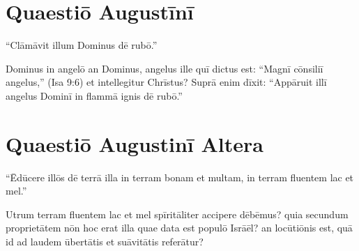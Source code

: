 \section{Quaestiō Augustīnī}

``Clāmāvit illum Dominus dē rubō.''

Dominus in angelō an Dominus, angelus ille quī dictus est: 
``Magnī cōnsiliī angelus,'' (Isa 9:6) et intellegitur Chrīstus? 
Suprā enim dīxit: ``Appāruit illī angelus Dominī in flammā ignis dē rubō.''

\section{Quaestiō Augustinī Altera}

``Ēdūcere illōs dē terrā illa in terram bonam et
multam, in terram fluentem lac et mel.'' 

Utrum terram fluentem lac et mel spīritāliter accipere
dēbēmus? quia secundum proprietātem nōn hoc erat
illa quae data est populō Isrāēl? 
an locūtiōnis est, quā id ad laudem ūbertātis et suāvitātis referātur?
